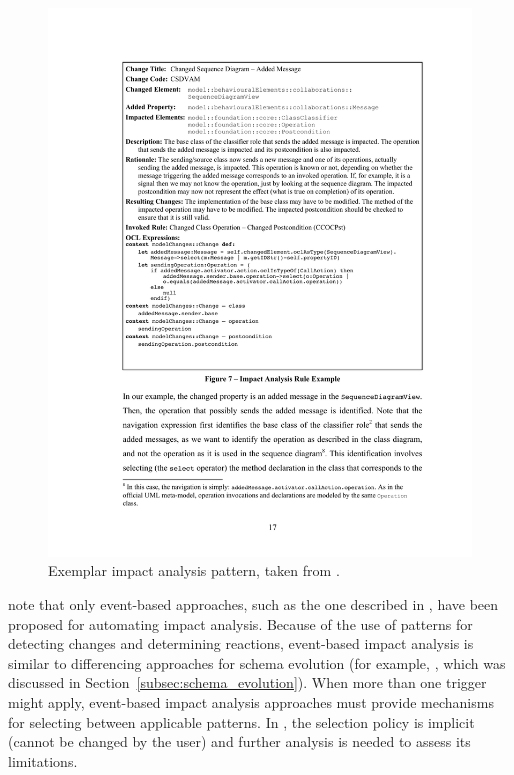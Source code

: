 \begin{figure}[htbp]
  \begin{center}
    \leavevmode
    \includegraphics[width=12cm]{3.LiteratureReview/images/impact_analysis_pattern.pdf}
  \end{center}
  \caption{Exemplar impact analysis pattern, taken from \cite{briand03impactanalysis}.}
  \label{fig:impact_analysis_pattern}
\end{figure}

\cite{winkler09survey} note that only event-based approaches, such as the one described in \cite{briand03impactanalysis}, have been proposed for automating impact analysis. Because of the use of patterns for detecting changes and determining reactions, event-based impact analysis is similar to differencing approaches for schema evolution (for example, \cite{lerner00model}, which was discussed in Section~\ref{subsec:schema_evolution}). When more than one trigger might apply, event-based impact analysis approaches must provide mechanisms for selecting between applicable patterns. In \cite{briand03impactanalysis}, the selection policy is implicit (cannot be changed by the user) and further analysis is needed to assess its limitations.

